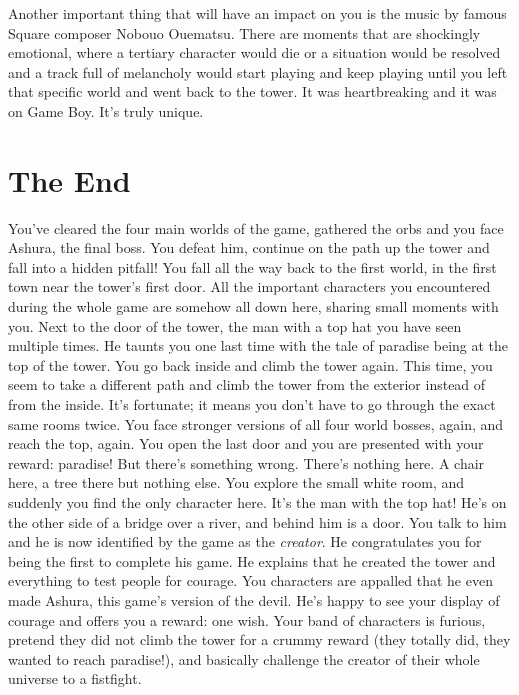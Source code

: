 \documentclass{book}
\begin{document}
Another important thing that will have an impact on you is the music by famous Square composer Nobouo Ouematsu. There are moments that are shockingly emotional, where a tertiary character would die or a situation would be resolved and a track full of melancholy would start playing and keep playing until you left that specific world and went back to the tower. It was heartbreaking and it was on Game Boy. It’s truly unique.

\FloatBarrier\needspace{5pt}\section*{The End}\nopagebreak[4]

You’ve cleared the four main worlds of the game, gathered the orbs and you face Ashura, the final boss. You defeat him, continue on the path up the tower and fall into a hidden pitfall! You fall all the way back to the first world, in the first town near the tower’s first door. All the important characters you encountered during the whole game are somehow all down here, sharing small moments with you. Next to the door of the tower, the man with a top hat you have seen multiple times. He taunts you one last time with the tale of paradise being at the top of the tower. You go back inside and climb the tower again. This time, you seem to take a different path and climb the tower from the exterior instead of from the inside. It’s fortunate; it means you don’t have to go through the exact same rooms twice. You face stronger versions of all four world bosses, again, and reach the top, again. You open the last door and you are presented with your reward: paradise! But there’s something wrong. There’s nothing here. A chair here, a tree there but nothing else. You explore the small white room, and suddenly you find the only character here. It’s the man with the top hat! He’s on the other side of a bridge over a river, and behind him is a door. You talk to him and he is now identified by the game as the \emph{creator}. He congratulates you for being the first to complete his game. He explains that he created the tower and everything to test people for courage. You characters are appalled that he even made Ashura, this game’s version of the devil. He’s happy to see your display of courage and offers you a reward: one wish. Your band of characters is furious, pretend they did not climb the tower for a crummy reward (they totally did, they wanted to reach paradise!), and basically challenge the creator of their whole universe to a fistfight.
\end{document}
